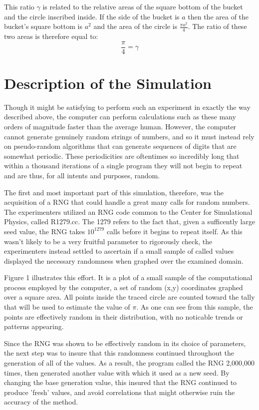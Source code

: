 \documentclass[twocolumn,prb,amsmath,amssymb,amsfonts]{revtex4}
\begin{document}
This ratio $\gamma$ is related to the relative areas of the square bottom of the bucket and the circle inscribed inside. If the side of the bucket is $a$ then the area of the bucket's square bottom is $a^2$ and the area of the circle is $\frac{\pi a^2}{4}$. The ratio of these two areas is therefore equal to:
\begin{equation}
\frac{\pi}{4} = \gamma
\end{equation}
\section{Description of the Simulation}
Though it might be satisfying to perform such an experiment in exactly the way described above, the computer can perform calculations such as these many orders of magnitude faster than the average human. However, the computer cannot generate genuinely random strings of numbers, and so it must instead rely on pseudo-random algorithms that can generate sequences of digits that are somewhat periodic. These periodicities are oftentimes so incredibly long that within a thousand iterations of a single program they will not begin to repeat and are thus, for all intents and purposes, random. 

The first and most important part of this simulation, therefore, was the acquisition of a RNG that could handle a great many calls for random numbers. The experimenters utilized an RNG code common to the Center for Simulational Physics, called R1279.cc. The 1279 refers to the fact that, given a sufficently large seed value, the RNG takes $10^{1279}$ calls before it begins to repeat itself. As this wasn't likely to be a very fruitful parameter to rigorously check, the experimenters instead settled to ascertain if a small sample of called values displayed the necessary randomness when graphed over the examined domain. 

Figure 1 illustrates this effort. It is a plot of a small sample of the computational process employed by the computer, a set of random (x,y) coordinates graphed over a square area. All points inside the traced circle are counted toward the tally that will be used to estimate the value of $\pi$. As one can see from this sample, the points are effectively random in their distribution, with no noticable trends or patterns appearing.

Since the RNG was shown to be effectively random in its choice of parameters, the next step was to insure that this randomness continued throughout the generation of all of the values. As a result, the program called the RNG 2,000,000 times, then generated another value with which it used as a new seed. By changing the base generation value, this insured that the RNG continued to produce 'fresh' values, and avoid correlations that might otherwise ruin the accuracy of the method.
\end{document}
